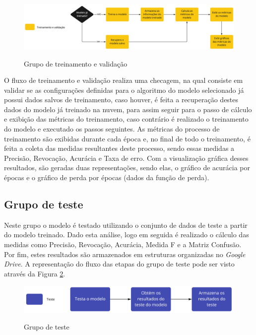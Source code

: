 \documentclass[
	12pt,				%
	oneside,			%
	a4paper,			%
	english,			%
	brazil				%
	]{abntex2ppgsi}
\begin{document}
\begin{figure}[H]
    \centering
    \caption{Grupo de treinamento e validação}
    \includegraphics[width=1.0\textwidth]{imagens/materiais_metodos/modulo_modelo/pipeline_modelo_cnn_grupo_treinamento_validacao.jpg}
    \label{fig:pipeline_modelo_cnn_grupo_treinamento_validacao}
\end{figure}

O fluxo de treinamento e validação realiza uma checagem, na qual consiste em validar se as configurações definidas para o algoritmo do modelo selecionado já possui dados salvos de treinamento, caso houver, é feita a recuperação destes dados do modelo já treinado na nuvem, para assim seguir para o passo de cálculo e exibição das métricas do treinamento, caso contrário é realizado o treinamento do modelo e executado os passos seguintes. As métricas do processo de treinamento são exibidas durante cada época e, no final de todo o treinamento, é feita a coleta das medidas resultantes deste processo, sendo essas medidas a Precisão, Revocação, Acurácia e Taxa de erro. Com a visualização gráfica desses resultados, são geradas duas representações, sendo elas, o gráfico de acurácia por épocas e o gráfico de perda por épocas (dados da função de perda).

\subsection{Grupo de teste}
Neste grupo o modelo é testado utilizando o conjunto de dados de teste a partir do modelo treinado. Dado esta análise, logo em seguida é realizado o cálculo das medidas como Precisão, Revocação, Acurácia, Medida F e a Matriz Confusão. Por fim, estes resultados são armazenados em estruturas organizadas no \textit{Google Drive}. A representação do fluxo das etapas do grupo de teste pode ser visto através da Figura \ref{fig:pipeline_modelo_cnn_grupo_teste}.

\begin{figure}[H]
    \centering
    \caption{Grupo de teste}
    \includegraphics[width=1.0\textwidth]{imagens/materiais_metodos/modulo_modelo/pipeline_modelo_cnn_grupo_teste.jpg}
    \label{fig:pipeline_modelo_cnn_grupo_teste}
\end{figure}
\end{document}
